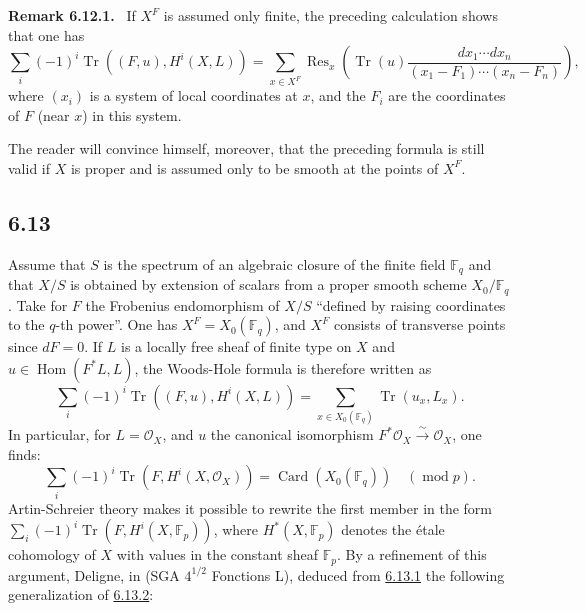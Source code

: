 \documentclass[11pt]{article}
\newenvironment{statement}[1]{\par\medskip\noindent\textbf{#1.}\ }{\par\medskip}
\DeclareMathOperator{\Hom}{Hom}
\providecommand{\OO}{\mathcal{O}}
\providecommand{\Hom}{\operatorname{Hom}}
\providecommand{\Hom}{\operatorname{Hom}}
\begin{document}
\label{sga5:III:remark:6.12.1}\begin{statement}{Remark 6.12.1}
If $X^F$ is assumed only finite, the preceding calculation shows that one has
\[
\sum_i(-1)^i\operatorname{Tr}((F,u),H^i(X,L))=
\sum_{x\in X^F}\operatorname{Res}_x\left(\operatorname{Tr}(u)\frac{dx_1\cdots dx_n}{(x_1-F_1)\cdots(x_n-F_n)}\right),
\]
where $(x_i)$ is a system of local coordinates at $x$, and the $F_i$ are the coordinates of $F$ (near $x$) in this system.

The reader will convince himself, moreover, that the preceding formula is still valid if $X$ is proper and is assumed only to be smooth at the points of $X^F$.
\end{statement}

\subsection*{6.13}\label{sga5:III:subsection:6.13}
Assume that $S$ is the spectrum of an algebraic closure of the finite field $\mathbb F_q$ and that $X/S$ is obtained by extension of scalars from a proper smooth scheme $X_0/\mathbb F_q$. Take for $F$ the Frobenius endomorphism of $X/S$ ``defined by raising coordinates to the $q$-th power''. One has $X^F=X_0(\mathbb F_q)$, and $X^F$ consists of transverse points since $dF=0$. If $L$ is a locally free sheaf of finite type on $X$ and $u\in\Hom(F^*L,L)$, the Woods-Hole formula is therefore written as
\begin{equation}
\tag{6.13.1}\label{sga5:III:equation:6.13.1}
\sum_i(-1)^i\operatorname{Tr}((F,u),H^i(X,L))=
\sum_{x\in X_0(\mathbb F_q)}\operatorname{Tr}(u_x,L_x).
\end{equation}
In particular, for $L=\OO_X$, and $u$ the canonical isomorphism $F^*\OO_X\xrightarrow{\sim}\OO_X$, one finds:
\begin{equation}
\tag{6.13.2}\label{sga5:III:equation:6.13.2}
\sum_i(-1)^i\operatorname{Tr}(F,H^i(X,\OO_X))=\operatorname{Card}(X_0(\mathbb F_q))\quad(\operatorname{mod} p).
\end{equation}
Artin-Schreier theory makes it possible to rewrite the first member in the form $\sum_i(-1)^i\operatorname{Tr}(F,H^i(X,\mathbb F_p))$, where $H^*(X,\mathbb F_p)$ denotes the étale cohomology of $X$ with values in the constant sheaf $\mathbb F_p$. By a refinement of this argument, Deligne, in (SGA $4^{1/2}$ Fonctions L), deduced from \hyperref[sga5:III:equation:6.13.1]{6.13.1} the following generalization of \hyperref[sga5:III:equation:6.13.2]{6.13.2}:
\end{document}
